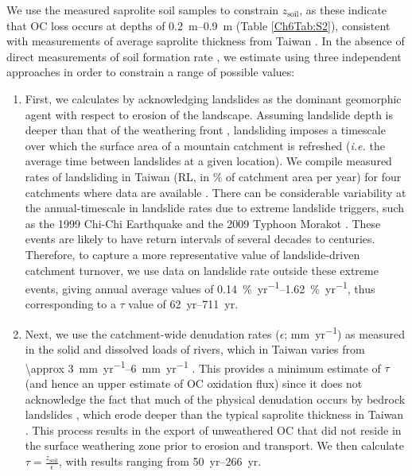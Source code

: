 We use the measured saprolite soil samples to constrain $z_{\text{soil}}$, as these indicate that OC loss occurs at depths of \SIrange{0.2}{0.9}{m} (Table \ref{Ch6Tab:S2}), consistent with measurements of average saprolite thickness from Taiwan \citep{Tsai:2001vp}. In the absence of direct measurements of soil formation rate \citep[\textit{e.g.}][]{Larsen:2014gq}, we estimate  using three independent approaches in order to constrain a range of possible values:

\begin{enumerate}[label=(\textit{\roman*})]
%
\item First, we calculates  by acknowledging landslides as the dominant geomorphic agent with respect to erosion of the landscape. Assuming landslide depth is deeper than that of the weathering front \citep[\SI{\approx 0.8}{m};][]{Tsai:2001vp}, landsliding imposes a timescale over which the surface area of a mountain catchment is refreshed (\textit{i.e.} the average time between landslides at a given location). We compile measured rates of landsliding in Taiwan (RL, in \% of catchment area per year) for four catchments where data are available \citep[Table \ref{Ch6Tab:S8};][]{Chang:2002wr,Chang:2007fm,Lin:2008fy,Chen:2013eh,Chen:2015hs}. There can be considerable variability at the annual-timescale in landslide rates \citep{Lin:2008fy} due to extreme landslide triggers, such as the 1999 Chi-Chi Earthquake \citep{Hovius:2011kc} and the 2009 Typhoon Morakot \citep{West:2011eo}. These events are likely to have return intervals of several decades to centuries. Therefore, to capture a more representative value of landslide-driven catchment turnover, we use data on landslide rate outside these extreme events, giving annual average values of \SIrange{0.14}{1.62}{\%.yr^{-1}}, thus corresponding to a $\tau$ value of \SIrange{62}{711}{yr}.
%
\item Next, we use the catchment-wide denudation rates ($\epsilon$; \si{mm.yr^{-1}}) as measured in the solid and dissolved loads of rivers, which in Taiwan varies from \SIrange{\approx 3}{6}{mm.yr^{-1}} \citep{Dadson:2003kl}. This provides a minimum estimate of $\tau$ (and hence an upper estimate of OC oxidation flux) since it does not acknowledge the fact that much of the physical denudation occurs by bedrock landslides \citep{Hovius:2000ht}, which erode deeper than the typical saprolite thickness in Taiwan \citep[\textit{i.e.} \SI{\approx 0.8}{m};][]{Tsai:2001vp,Larsen:2010dr}. This process results in the export of unweathered OC that did not reside in the surface weathering zone prior to erosion and transport. We then calculate $\tau = \frac{z_{\text{soil}}}{\epsilon}$, with results ranging from \SIrange{50}{266}{yr}.

\end{enumerate}
